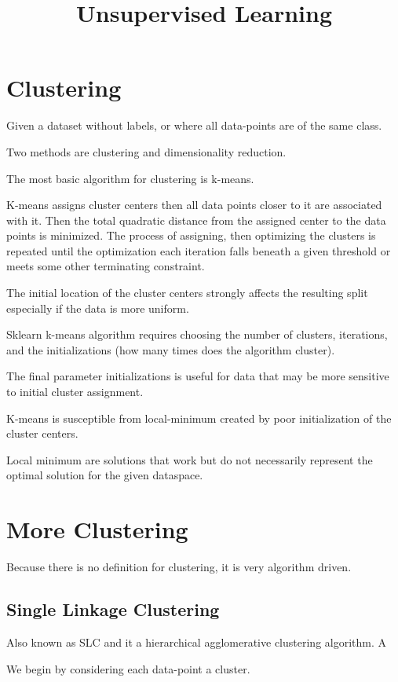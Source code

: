 \documentclass{article}
\title{Unsupervised Learning}
\author{}
\date{}
\begin{document}
\nocite{*}
\maketitle
\section{Clustering}
Given a dataset without labels, or where all data-points are of the same class. 

Two methods are clustering and dimensionality reduction.

The most basic algorithm for clustering is k-means. 

K-means assigns cluster centers then all data points closer to 
it are associated with it. Then the total quadratic distance from the assigned 
center to the data points is minimized. The process of assigning, then
optimizing the clusters is repeated until the optimization each iteration falls
beneath a given threshold or meets some other terminating constraint. 

The initial location of the cluster centers strongly affects the resulting split
especially if the data is more uniform.

Sklearn k-means algorithm requires choosing the number of clusters, iterations,
and the initializations (how many times does the algorithm cluster). 

The final parameter initializations is useful for data that may be more
sensitive to initial cluster assignment. 

K-means is susceptible from local-minimum created by poor initialization of the 
cluster centers. 

Local minimum are solutions that work but do not necessarily represent the 
optimal solution for the given dataspace.

\section{More Clustering}

Because there is no definition for clustering, it is very algorithm driven.

\subsection{Single Linkage Clustering}

Also known as SLC and it a hierarchical agglomerative clustering algorithm. A

We begin by considering each data-point a cluster. 
\end{document}
